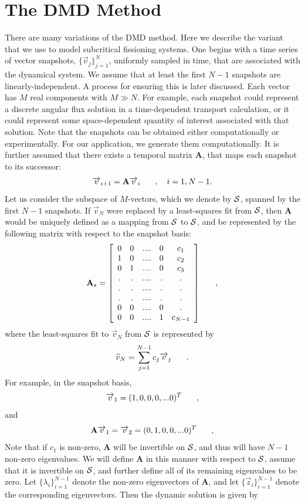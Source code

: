 \documentclass[12pt]{article}
\newcommand{\bracket}[1]{\left[ #1 \right]}
\renewcommand{\vec}[1]{\overrightarrow{#1}}
\newcommand{\be}{\begin{equation}}
\newcommand{\ee}{\end{equation}}
\newcommand{\pec}{\hspace{0.25in},}
\newcommand{\pep}{\hspace{0.25in}.}
\newcommand{\LEQ}[1]{\label{eq:#1}}
\newcommand{\cS}{{\cal S}}
\newcommand{\mA}{\mathbf{A}}
\begin{document}
\section{The DMD Method}
There are many variations of the DMD method.  
Here we describe the variant that we use to model subcritical fissioning systems.  
One begins with a time series of vector snapshots, $\{\vec{v}_j\}_{j=1}^{N}$,
 uniformly sampled in time, that are associated with the dynamical system. 
We assume that at least the first $N-1$ snapshots are linearly-independent. 
A process for ensuring this is later discussed.  
Each vector has $M$ real components with $M \gg N$. 
For example, each snapshot could represent a discrete angular flux solution in a time-dependent transport 
 calculation, or it could represent some space-dependent quantity of interest 
 associated with that solution.  
Note that the snapshots can be obtained either computationally or experimentally. 
For our application, we generate them computationally. 
It is further assumed that there exists a temporal matrix $\mathbf{A}$, that 
 maps each snapshot to its successor:
\be
	\vec{v}_{i+1} = \mA \vec{v}_{i} \pec \quad i=1,N-1.
	\LEQ{2.1}
\ee
Let us consider the subspace of $M$-vectors, which we denote by $\cS$, spanned 
 by the first $N-1$ snapshots.  
If $\vec{v}_N$ were replaced by a least-squares fit from $\cS$, then $\mA$ 
 would be uniquely defined as a mapping from $\cS$ to $\cS$, and be represented 
 by the following matrix with respect to the snapshot basis:
\be
	\mA_s = \bracket{
	\begin{array}{ccccccc}
		0 & 0 & ....& 0 & c_1 \\
		1 & 0 & ....& 0 & c_2 \\
		0 & 1 & ....& 0 & c_3 \\
		. & . & ....& . & . \\
		. & . & ....& . & . \\
		. & . & ....& . & . \\
		0 & 0 & ....& 0 & . \\
		0 & 0 & ....& 1 & c_{N-1}
	\end{array}
	} \pec
	\LEQ{2.2}
\ee
where the least-squares fit to $\vec{v}_N$ from $\cS$ is represented by 
\be
	\widehat{v}_N = \sum_{j=1}^{N-1} c_j \vec{v}_j \pep
	\LEQ{2.3}
\ee
For example, in the snapshot basis, 
\be
	\vec{v}_1 = (1,0,0,0,...0)^T \pec
	\LEQ{2.4}
\ee
and 
\be
	\mA \vec{v}_1 = \vec{v}_2 = (0,1,0,0,...0)^T \pec
	\LEQ{2.5}
\ee
Note that if $c_1$ is non-zero, $\mA$ will be invertible on $\cS$, and thus 
 will have $N-1$ non-zero eigenvalues. 
We will define $\mA$ in this manner with respect to $\cS$, assume that it is 
 invertible on $\cS$, and further define all of its remaining eigenvalues to be zero.  
Let $\{\lambda_i\}_{i=1}^{N-1}$ denote the non-zero eigenvectors of $\mA$, and 
 let $\{\vec{z}_i\}_{i=1}^{N-1}$ denote the corresponding eigenvectors. 
Then the dynamic solution is given by 
\end{document}
